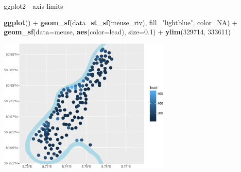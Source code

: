 \documentclass[11pt,ignorenonframetext,]{beamer}
\newenvironment{Shaded}{}{}
\newcommand{\KeywordTok}[1]{\textcolor[rgb]{0.00,0.44,0.13}{\textbf{#1}}}
\newcommand{\DataTypeTok}[1]{\textcolor[rgb]{0.56,0.13,0.00}{#1}}
\newcommand{\DecValTok}[1]{\textcolor[rgb]{0.25,0.63,0.44}{#1}}
\newcommand{\FloatTok}[1]{\textcolor[rgb]{0.25,0.63,0.44}{#1}}
\newcommand{\StringTok}[1]{\textcolor[rgb]{0.25,0.44,0.63}{#1}}
\newcommand{\OtherTok}[1]{\textcolor[rgb]{0.00,0.44,0.13}{#1}}
\newcommand{\OperatorTok}[1]{\textcolor[rgb]{0.40,0.40,0.40}{#1}}
\newcommand{\NormalTok}[1]{#1}
\let\oldShaded\Shaded
\let\endoldShaded\endShaded
\renewenvironment{Shaded}{\footnotesize\begin{spacing}{0.9}\oldShaded}{\endoldShaded\end{spacing}}
\let\oldverbatim\verbatim
\let\endoldverbatim\endverbatim
\newcommand{\scriptoutput}{
  \renewenvironment{Shaded}{\scriptsize\begin{spacing}{0.9}\oldShaded}{\endoldShaded\end{spacing}}
  \renewenvironment{verbatim}{\scriptsize\begin{spacing}{0.9}\oldverbatim}{\endoldverbatim\end{spacing}}
}
\begin{document}
\begin{frame}[fragile,t]{ggplot2 - axis limits}

\scriptoutput

\begin{Shaded}
\begin{Highlighting}[]
\KeywordTok{ggplot}\NormalTok{() }\OperatorTok{+}
\StringTok{  }\KeywordTok{geom_sf}\NormalTok{(}\DataTypeTok{data=}\KeywordTok{st_sf}\NormalTok{(meuse_riv), }\DataTypeTok{fill=}\StringTok{"lightblue"}\NormalTok{, }\DataTypeTok{color=}\OtherTok{NA}\NormalTok{) }\OperatorTok{+}
\StringTok{  }\KeywordTok{geom_sf}\NormalTok{(}\DataTypeTok{data=}\NormalTok{meuse, }\KeywordTok{aes}\NormalTok{(}\DataTypeTok{color=}\NormalTok{lead), }\DataTypeTok{size=}\FloatTok{0.1}\NormalTok{) }\OperatorTok{+}
\StringTok{  }\KeywordTok{ylim}\NormalTok{(}\DecValTok{329714}\NormalTok{, }\DecValTok{333611}\NormalTok{)}
\end{Highlighting}
\end{Shaded}

\begin{center}\includegraphics[width=0.65\textwidth]{Lec17_files/figure-beamer/unnamed-chunk-13-1} \end{center}

\end{frame}
\end{document}
